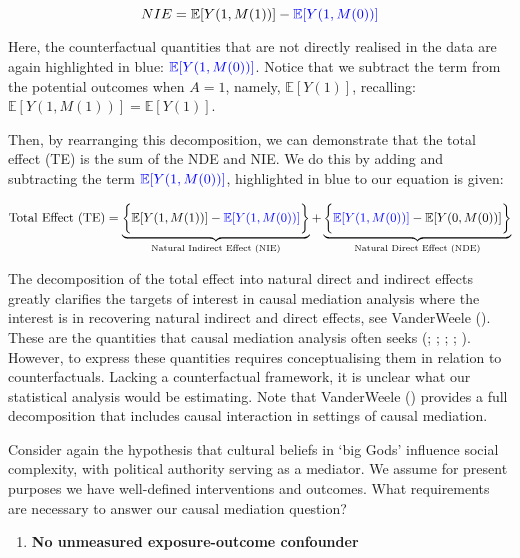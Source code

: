 \documentclass[
  single column]{article}
\providecommand{\tightlist}{%
  \setlength{\itemsep}{0pt}\setlength{\parskip}{0pt}}\usepackage{longtable,booktabs,array}
\begin{document}
\[
 NIE = \mathbb{E}[Y(1, M(1))] - \textcolor{blue}{\mathbb{E}[Y(1, M(0))]}
\]

Here, the counterfactual quantities that are not directly realised in
the data are again highlighted in blue:
\(\textcolor{blue}{\mathbb{E}[Y(1, M(0))]}\). Notice that we subtract
the term from the potential outcomes when \(A=1\), namely,
\(\mathbb{E}[Y(1)]\), recalling:
\(\mathbb{E}[Y(1, M(1))] = \mathbb{E}[Y(1)]\).

Then, by rearranging this decomposition, we can demonstrate that the
total effect (TE) is the sum of the NDE and NIE. We do this by adding
and subtracting the term \(\textcolor{blue}{\mathbb{E}[Y(1, M(0))]}\),
highlighted in blue to our equation is given:

\[
\text{Total Effect (TE)} = \underbrace{\bigg\{\mathbb{E}[Y(1, M(1))] - \textcolor{blue}{\mathbb{E}[Y(1, M(0))]}\bigg\}}_{\text{Natural Indirect Effect (NIE)}} + \underbrace{\bigg\{\textcolor{blue}{\mathbb{E}[Y(1, M(0))]} - \mathbb{E}[Y(0, M(0))]\bigg\}}_{\text{Natural Direct Effect (NDE)}}
\]

The decomposition of the total effect into natural direct and indirect
effects greatly clarifies the targets of interest in causal mediation
analysis where the interest is in recovering natural indirect and direct
effects, see VanderWeele (). These
are the quantities that causal mediation analysis often seeks
(;
;
;
;
).
However, to express these quantities requires conceptualising them in
relation to counterfactuals. Lacking a counterfactual framework, it is
unclear what our statistical analysis would be estimating. Note that
VanderWeele () provides a full
decomposition that includes causal interaction in settings of causal
mediation.

Consider again the hypothesis that cultural beliefs in `big Gods'
influence social complexity, with political authority serving as a
mediator. We assume for present purposes we have well-defined
interventions and outcomes. What requirements are necessary to answer
our causal mediation question?

\begin{enumerate}
\def\labelenumi{\arabic{enumi}.}
\tightlist
\item
  \textbf{No unmeasured exposure-outcome confounder}
\end{enumerate}
\end{document}
